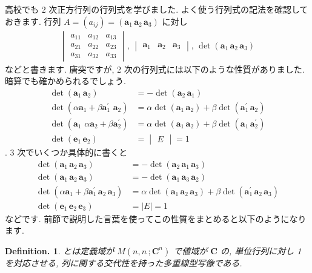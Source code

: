\documentclass[openany, a4paper, oneside]{jsbook}
\theoremstyle{break}
\theoremstyle{breakdefn}
\newtheorem{defn}[thm]{Definition.}
\begin{document}
高校でも 2 次正方行列の行列式を学びました. よく使う行列式の記法を確認しておきます.
行列 $A = (a_{ij}) = (\bm{a}_{1}\, \bm{a}_{2} \, \bm{a}_{3})$ に対し
\begin{align}
 \begin{vmatrix} a_{11} & a_{12} & a_{13} \\ a_{21} & a_{22} & a_{23} \\ a_{31} & a_{32} & a_{33} \end{vmatrix} , \,
 \begin{vmatrix} \bm{a}_{1} & \bm{a}_{2} & \bm{a}_{3} \end{vmatrix} ,\,
 \det \left ( \bm{a}_{1} \, \bm{a}_{2} \, \bm{a}_{3} \right)
\end{align}
などと書きます. 唐突ですが, 2 次の行列式には以下のような性質がありました.
暗算でも確かめられるでしょう.
\begin{align}
 \det \left ( \bm{a}_{1} \, \bm{a}_{2} \right)
 &= - \det \left ( \bm{a}_{2} \, \bm{a}_{1} \right) \\
 \det \left ( \alpha \bm{a}_{1} + \beta \bm{a}^{'}_{1}  \,\, \bm{a}_{2} \right)
 &= \alpha \det \left ( \bm{a}_{1} \, \bm{a}_{2} \right)
 +\beta \det \left (  \bm{a}^{'}_{1}  \, \bm{a}_{2} \right) \\
 \det \left ( \bm{a}_{1} \,\, \alpha \bm{a}_{2} + \beta \bm{a}^{'}_{2}  \right)
 &= \alpha \det \left ( \bm{a}_{1} \, \bm{a}_{2} \right) + \beta \det \left (  \bm{a}_{1}  \, \bm{a}^{'}_{2} \right) \\
 \det \left ( \bm{e}_{1} \, \bm{e}_{2} \right) &= \begin{vmatrix} E \end{vmatrix} = 1
\end{align}
. 3 次でいくつか具体的に書くと
\begin{align}
 \det \left ( \bm{a}_{1} \, \bm{a}_{2} \, \bm{a}_{3} \right)
 &= - \det \left ( \bm{a}_{2} \, \bm{a}_{1} \, \bm{a}_{3} \right) \\
 \det \left ( \bm{a}_{1} \, \bm{a}_{2} \, \bm{a}_{3} \right)
 &= - \det \left ( \bm{a}_{1} \, \bm{a}_{3} \, \bm{a}_{2} \right) \\
 \det \left ( \alpha \bm{a}_{1} + \beta \bm{a}^{'}_{1}  \, \bm{a}_{2}  \, \bm{a}_{3} \right)
 &=
 \alpha \det \left ( \bm{a}_{1} \, \bm{a}_{2} \, \bm{a}_{3} \right)
 +\beta \det \left (  \bm{a}^{'}_{1}  \, \bm{a}_{2} \, \bm{a}_{3} \right) \\
 \det \left ( \bm{e}_{1} \, \bm{e}_{2} \, \bm{e}_{3} \right) &= \mid E \mid = 1
\end{align}
などです.
前節で説明した言葉を使ってこの性質をまとめると以下のようになります.
\begin{defn}
 とは定義域が $M \left ( n,n \, ; \bm{C}^n \right)$ で値域が $\bm{C}$ の,
 単位行列に対し 1 を対応させる, 列に関する交代性を持った多重線型写像である.
\end{defn}
\end{document}
